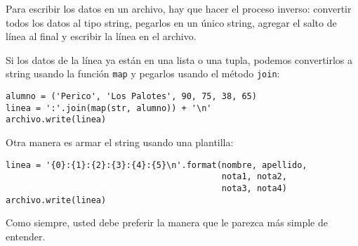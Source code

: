 Para escribir los datos en un archivo, hay que hacer el proceso inverso:
convertir todos los datos al tipo string, pegarlos en un único string,
agregar el salto de línea al final y escribir la línea en el archivo.

Si los datos de la línea ya están en una lista o una tupla, podemos
convertirlos a string usando la función \lstinline!map! y pegarlos
usando el método \lstinline!join!:

\begin{lstlisting}
alumno = ('Perico', 'Los Palotes', 90, 75, 38, 65)
linea = ':'.join(map(str, alumno)) + '\n'
archivo.write(linea)
\end{lstlisting}

Otra manera es armar el string usando una plantilla:

\begin{lstlisting}
linea = '{0}:{1}:{2}:{3}:{4}:{5}\n'.format(nombre, apellido,
                                           nota1, nota2,
                                           nota3, nota4)
archivo.write(linea)
\end{lstlisting}

Como siempre, usted debe preferir la manera que le parezca más simple de
entender.
